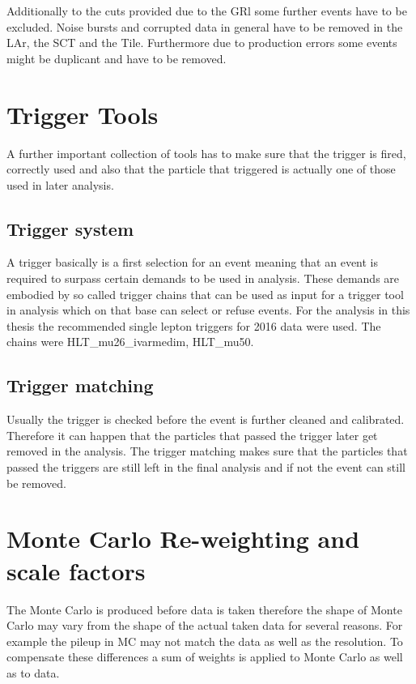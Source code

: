 Additionally to the cuts provided due to the GRl some further events have to be excluded. Noise bursts and corrupted data in general have to be removed in the LAr, the SCT and the Tile. Furthermore due to production errors some events might be duplicant and have to be removed. 



\section{Trigger Tools}

A further important collection of tools has to make sure that the trigger is fired, correctly used and also that the particle that triggered is actually one of those used in later analysis.

\subsection{Trigger system}


A trigger basically is a first selection for an event meaning that an event is required to surpass certain demands to be used in analysis. These demands are embodied by so called trigger chains that can be used as input for a trigger tool in analysis which on that base can select or refuse events. For the analysis in this thesis the recommended single lepton triggers for 2016 data were used. The chains were HLT_mu26_ivarmedim, HLT_mu50.



\subsection{Trigger matching}

Usually the trigger is checked before the event is further cleaned and calibrated. Therefore it can happen that the particles that passed the trigger later get removed in the analysis. The trigger matching makes sure that the particles that passed the triggers are still left in the final analysis and if not the event can still be removed.

\section{Monte Carlo Re-weighting and scale factors}

The Monte Carlo is produced before data is taken therefore the shape of Monte Carlo may vary from the shape of the actual taken data for several reasons. For example the pileup in MC may not match the data as well as the resolution. To compensate these differences a sum of weights is applied to Monte Carlo as well as to data.

